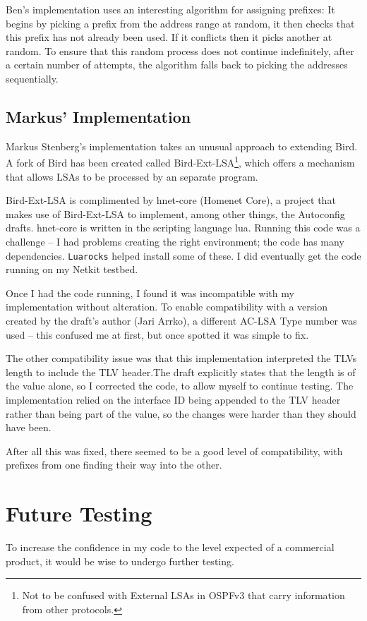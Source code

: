 \documentclass[12pt]{report}
\begin{document}
Ben's implementation uses an interesting algorithm for assigning prefixes:
It begins by picking a prefix from the address range at random, it then checks
that this prefix has not already been used. If it conflicts then it picks
another at random. To ensure that this random process does not continue
indefinitely, after a certain number of attempts, the algorithm falls back to
picking the addresses sequentially. 

\subsection{Markus' Implementation}
Markus Stenberg's implementation takes an unusual approach to extending Bird. A
fork of Bird has been created called Bird-Ext-LSA\@\footnote{Not to be confused
with External LSAs in OSPFv3 that carry information from other protocols.},
which offers a mechanism that allows LSAs to be processed by an separate
program. 

Bird-Ext-LSA is complimented by hnet-core (Homenet Core), a project that makes
use of Bird-Ext-LSA to implement, among other things, the Autoconfig drafts\@.
hnet-core is written in the scripting language lua. Running this code was a
challenge -- I had problems creating the right environment; the code has  many
dependencies. \texttt{Luarocks} helped install some of these. I did eventually
get the code running on my Netkit testbed.

Once I had the code running, I found it was incompatible with my implementation
without alteration. To enable compatibility with a version created by the
draft's author (Jari Arrko), a different AC-LSA Type number was used -- this
confused me at first, but once spotted it was simple to fix.

The other compatibility issue was that this implementation interpreted the TLVs
length to include the TLV header.The draft explicitly states that the length is
of the value alone, so I corrected the code, to allow myself to continue
testing. The implementation relied on the interface ID being appended to the
TLV header rather than being part of the value, so the changes were harder than
they should have been.

After all this was fixed, there seemed to be a good level of compatibility,
with prefixes from one finding their way into the other.

\section{Future Testing}
To increase the confidence in my code to the level expected of a
commercial product, it would be wise to undergo further testing. 
\end{document}
